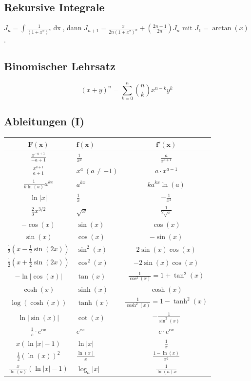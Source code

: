 \documentclass[a4paper,10pt]{article}
\def\dx{\mathop{dx}}
\begin{document}
\subsection{Rekursive Integrale}

$J_n = \int \frac{1}{(1 + x^2)^n} \dx$, dann $J_{n+1} = \frac{x}{2n(1 + x^2)^n} + (\frac{2n - 1}{2n})J_n$ mit $J_1 = \arctan(x)$.

\subsection{Binomischer Lehrsatz}

$$(x+y)^n = \sum_{k=0}^n {n \choose k} x^{n-k} y^k$$

\subsection{Ableitungen (I)}
\begin{center}
  \begin{tabularx}{\linewidth}{c>{\centering\arraybackslash}Xc}
  \toprule
  $\mathbf{F(x)}$ & $\mathbf{f(x)}$ & $\mathbf{f'(x)}$ \\
  \midrule
  $\frac{x^{-a+1}}{-a+1}$ & $\frac{1}{x^a}$ & $\frac{a}{x^{a+1}}$ \\
  $\frac{x^{a+1}}{a+1}$ & $x^a \ (a \ne -1)$ & $a \cdot x^{a-1}$ \\
  $\frac{1}{k \ln(a)}a^{kx}$ & $a^{kx}$ & $ka^{kx} \ln(a)$ \\
  $\ln |x|$ & $\frac{1}{x}$ & $-\frac{1}{x^2}$ \\
  $\frac{2}{3}x^{3/2}$ & $\sqrt{x}$ & $\frac{1}{2\sqrt{x}}$\\
  $-\cos(x)$ & $\sin(x)$ & $\cos(x)$ \\
  $\sin(x)$ & $\cos(x)$ & $-\sin(x)$ \\
  $\frac{1}{2}(x-\frac{1}{2}\sin(2x))$ & $\sin^2(x)$ & $2 \sin(x)\cos(x)$ \\
  $\frac{1}{2}(x + \frac{1}{2}\sin(2x))$ & $\cos^2(x)$ & $-2\sin(x)\cos(x)$ \\
  $-\ln|\cos(x)|$ & $\tan(x)$ & $\frac{1}{\cos^2(x)} = 1 + \tan^2(x)$  \\
  $\cosh(x)$ & $\sinh(x)$ & $\cosh(x)$ \\
  $\log(\cosh(x))$ & $\tanh(x)$ & $\frac{1}{\cosh^2(x)} = 1 - \tanh^2(x)$ \\
  $\ln | \sin(x)|$ & $\cot(x)$ & $-\frac{1}{\sin^2(x)}$ \\
  $\frac{1}{c} \cdot e^{cx}$ & $e^{cx}$ & $c \cdot e^{cx}$ \\
  $x(\ln |x| - 1)$ & $\ln |x|$ & $\frac{1}{x}$ \\
  $\frac{1}{2}(\ln(x))^2$ & $\frac{\ln(x)}{x}$ & $\frac{1 - \ln(x)}{x^2}$ \\
  $\frac{x}{\ln(a)} (\ln|x| -1)$ & $\log_a |x|$ & $\frac{1}{\ln(a)x}$ \\
  \bottomrule
  \end{tabularx}
\end{center}
\end{document}
